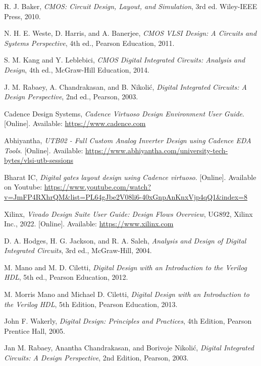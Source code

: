 \documentclass[12pt]{article}
\begin{document}
\newpage
\begin{thebibliography}{99}

R. J. Baker, \textit{CMOS: Circuit Design, Layout, and Simulation}, 3rd ed. Wiley-IEEE Press, 2010.

N. H. E. Weste, D. Harris, and A. Banerjee, \textit{CMOS VLSI Design: A Circuits and Systems Perspective}, 4th ed., Pearson Education, 2011.

S. M. Kang and Y. Leblebici, \textit{CMOS Digital Integrated Circuits: Analysis and Design}, 4th ed., McGraw-Hill Education, 2014.

J. M. Rabaey, A. Chandrakasan, and B. Nikolić, \textit{Digital Integrated Circuits: A Design Perspective}, 2nd ed., Pearson, 2003.

Cadence Design Systems, \textit{Cadence Virtuoso Design Environment User Guide}. [Online]. Available: \url{https://www.cadence.com}

Abhiyantha, \textit{UTB02 - Full Custom Analog Inverter Design using Cadence EDA Tools}. [Online]. Available: \url{https://www.abhiyantha.com/university-tech-bytes/vlsi-utb-sessions}

Bharat IC, \textit{Digital gates layout design using Cadence virtuoso}. [Online]. Available on Youtube: \url{https://www.youtube.com/watch?v=JmFP4RXhrQM&list=PL64gJbe2V08li6-40xGnpAnKnxVjp4qQ1&index=8}


Xilinx, \textit{Vivado Design Suite User Guide: Design Flows Overview}, UG892, Xilinx Inc., 2022. [Online]. Available: \url{https://www.xilinx.com}

D. A. Hodges, H. G. Jackson, and R. A. Saleh, \textit{Analysis and Design of Digital Integrated Circuits}, 3rd ed., McGraw-Hill, 2004.

M. Mano and M. D. Ciletti, \textit{Digital Design with an Introduction to the Verilog HDL}, 5th ed., Pearson Education, 2012.

M. Morris Mano and Michael D. Ciletti, 
\textit{Digital Design with an Introduction to the Verilog HDL}, 
5th Edition, Pearson Education, 2013.

John F. Wakerly,
\textit{Digital Design: Principles and Practices},
4th Edition, Pearson Prentice Hall, 2005.

Jan M. Rabaey, Anantha Chandrakasan, and Borivoje Nikolić,
\textit{Digital Integrated Circuits: A Design Perspective},
2nd Edition, Pearson, 2003.


\end{thebibliography}
\end{document}
